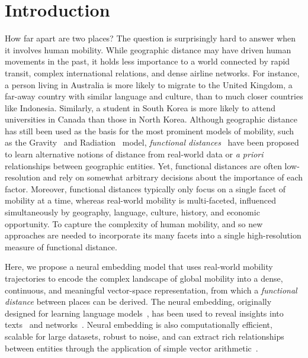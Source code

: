 \documentclass[12pt]{article} %
\begin{document}
%
%
\section{Introduction}\label{sec:introduction} %


How far apart are two places?
The question is surprisingly hard to answer when it involves human mobility.
While geographic distance may have driven human movements in the past, it holds less importance to a world connected by rapid transit, complex international relations, and dense airline networks.
For instance, a person living in Australia is more likely to migrate to the United Kingdom, a far-away country with similar language and culture, than to much closer countries like Indonesia. 
Similarly, a student in South Korea is more likely to attend universities in Canada than those in North Korea. 
Although geographic distance has still been used as the basis for the most prominent models of mobility, such as the Gravity~\autocite{zipf1946gravity} and Radiation~\autocite{simini2012universal} model,  \textit{functional distances}~\autocite{boschma2005proximity, brown1970functional, brown1970migration, kim2018functional} have been proposed to learn alternative notions of distance from real-world data or \textit{a priori} relationships between geographic entities. 
Yet, functional distances are often low-resolution and rely on somewhat arbitrary decisions about the importance of each factor.
Moreover, functional distances typically only focus on a single facet of mobility at a time, whereas real-world mobility is multi-faceted, influenced simultaneously by geography, language, culture, history, and economic opportunity. 
To capture the complexity of human mobility, and so new approaches are needed to incorporate its many facets into a single high-resolution measure of functional distance.


Here, we propose a neural embedding model that uses real-world mobility trajectories to encode the complex landscape of global mobility into a dense, continuous, and meaningful vector-space representation, from which a \textit{functional distance} between places can be derived.
The neural embedding, originally designed for learning language models~\autocite{mikolov2013word2vec}, has been used to reveal insights into texts~\autocite{linzhuo2020hyperbolic, tshitoyan2019mat2vec, garg2018gender, kozlowski2018geometry, hamilton2016diachronic, le2014doc2vec, nakandala2016twitch} and networks~\autocite{perozzi2014deepwalk, grover2016node2vec}.
Neural embedding is also computationally efficient, scalable for large datasets, robust to noise, and can extract rich relationships between entities through the application of simple vector arithmetic~\autocite{levy2014neural, nakandala2017gendered, kozlowski2018geometry, an2018semaxis}. 
\end{document}

